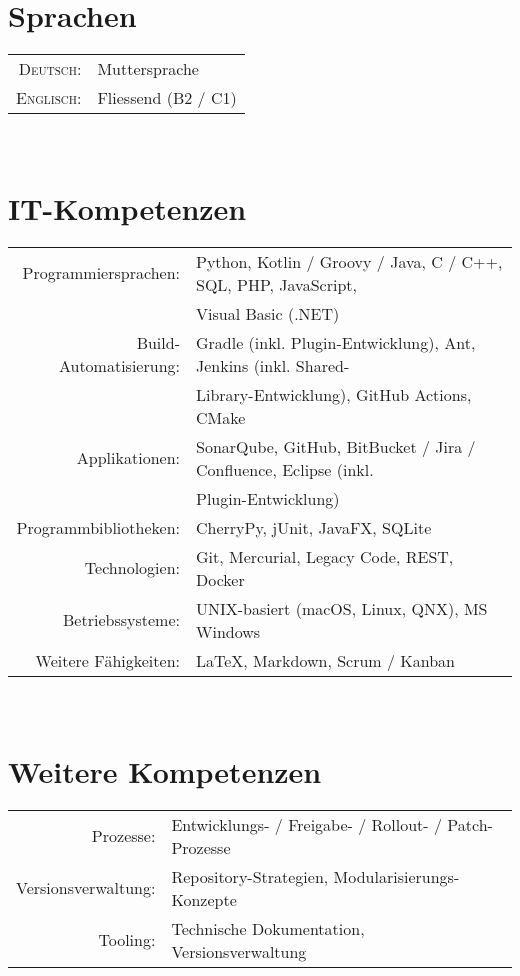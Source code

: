 \documentclass[10pt,a4paper]{article}
\begin{document}
\section{Sprachen}

\begin{tabular}{rl}
	\textsc{Deutsch:}		& Muttersprache \\
	\textsc{Englisch:}		& Fliessend (B2 / C1) \\
\end{tabular} \\


\section{IT-Kompetenzen}

\begin{tabular}{rl}
	Programmiersprachen:	& Python, Kotlin / Groovy / Java, C / C++, SQL, PHP, JavaScript, \\
						& Visual Basic (.NET) \\
	Build-Automatisierung:	& Gradle (inkl. Plugin-Entwicklung), Ant, Jenkins (inkl. Shared-\\
						& Library-Entwicklung), GitHub Actions, CMake \\
	Applikationen:			& SonarQube, GitHub, BitBucket / Jira / Confluence, Eclipse (inkl. \\
						& Plugin-Entwicklung) \\
	Programmbibliotheken:	& CherryPy, jUnit, JavaFX, SQLite \\
	Technologien:			& Git, Mercurial, Legacy Code, REST,  Docker \\
	Betriebssysteme:		& UNIX-basiert (macOS, Linux, QNX), MS Windows \\
	Weitere F\"ahigkeiten:	& {\fb \LaTeX}\setmainfont[SmallCapsFont=Fontin-SmallCaps.otf]{Fontin.otf}, Markdown, Scrum / Kanban \\
\end{tabular} \\


\section{Weitere Kompetenzen}

\begin{tabular}{rl}
	Prozesse:				& Entwicklungs- / Freigabe- / Rollout- / Patch-Prozesse \\
	Versionsverwaltung:		& Repository-Strategien, Modularisierungs-Konzepte \\
	Tooling:				& Technische Dokumentation, Versionsverwaltung \\
\end{tabular} \\
\end{document}

